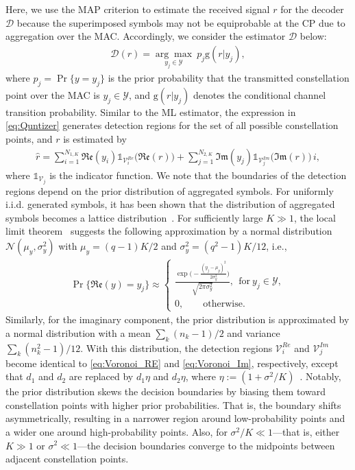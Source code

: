 \documentclass[journal,12pt,onecolumn,draftclsnofoot]{IEEEtran}
\theoremstyle{definition}
\begin{document}
Here, we use the MAP criterion to estimate the received signal $r$ for the decoder $\mathscr{D}$ because the superimposed symbols may not be equiprobable at the CP due to aggregation over the MAC. Accordingly,  we consider the estimator  $\mathscr{D}$ below:  
\begin{align}
    \label{eq:Quntizer}
    \mathscr{D}(r) =  \underset{y_j \in\mathcal{Y}}{\arg\max}~p_j\mathrm{g}(r|y_j),
\end{align}
where  $p_{j} = \Pr\{y=y_j\}$ is the prior probability that the transmitted constellation point over the MAC is $y_j\in \mathcal{Y}$, and $\mathrm{g}(r|y_j)$ denotes the conditional channel transition probability. Similar to the ML estimator, the expression in \eqref{eq:Quntizer} generates detection regions for the set of all possible constellation points, and $r$ is estimated by 
\begin{align}
    \hat{r} =  \sum_{i=1}^{N_{1,K}} \mathfrak{Re}(y_{i})\mathds{1}_{\mathcal{V}_i^{Re}}\big(\mathfrak{Re}(r)\big) + \sum_{j=1}^{N_{2,K}} \mathfrak{Im}(y_j)\mathds{1}_{\mathcal{V}_j^{Im}}\big(\mathfrak{Im}(r)\big)\,i,
\end{align} 
where $\mathds{1}_{\mathcal{V}_j}$ is the indicator function. We note that the boundaries of the detection regions depend on the prior distribution of aggregated symbols. For uniformly i.i.d. generated symbols, it has been shown that the distribution of aggregated symbols becomes a lattice distribution~\cite[Lemma 1]{liu2025digital}. For sufficiently large $K\gg 1$, the local limit theorem~\cite{gnedenko1968limit} suggests the following approximation by a normal distribution $\mathcal{N}(\mu_y, \sigma_y^2)$ with $\mu_y = (q-1)K/2$ and $\sigma_y^2 = (q^2-1)K/12$, i.e., 
\begin{align}
    \label{eq:prior_dist}
    \Pr\{\mathfrak{Re}(y)=y_j\} \approx \begin{cases} \frac{\exp{\Big(-\frac{(y_j-\mu_y)^2}{2\sigma_y^2}\Big)}}{\sqrt{2\pi \sigma_y^2}}, ~~ \text{for}~y_j \in \mathcal{Y}, \\
      0, \quad   \quad  \text{otherwise}.
    \end{cases}
\end{align}
Similarly, for the imaginary component, the prior distribution is approximated by a normal distribution with a mean $\sum_{k}(n_k-1)/2$ and variance $\sum_{k}(n_{k}^2-1)/12$. With this distribution, the detection regions $\mathcal{V}_i^{Re}$ and $\mathcal{V}_j^{Im}$ become identical to \eqref{eq:Voronoi_RE} and \eqref{eq:Voronoi_Im}, respectively, except that $d_1$ and $d_2$ are replaced by $d_1\eta$ and $d_2\eta$, where $\eta:= (1+\sigma^2/K)$~\cite[Proposition 1]{liu2025digital}. Notably, the prior distribution skews the decision boundaries by biasing them toward constellation points with higher prior probabilities. That is, the boundary shifts asymmetrically, resulting in a narrower region around low-probability points and a wider one around high-probability points. Also, for $\sigma^2/K \ll 1$—that is, either $K\gg 1$ or $\sigma^2\ll 1$—the decision boundaries converge to the midpoints between adjacent constellation points. 
\end{document}
